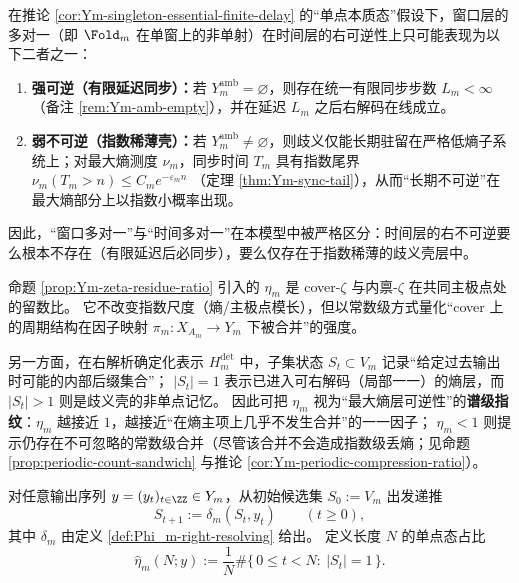 \begin{corollary}\label{cor:Ym-time-layer-dichotomy}
在推论 \ref{cor:Ym-singleton-essential-finite-delay} 的“单点本质态”假设下，窗口层的多对一（即 \(\Fold_m\) 在单窗上的非单射）在时间层的右可逆性上只可能表现为以下二者之一：
\begin{enumerate}
  \item \textbf{强可逆（有限延迟同步）：}若 \(Y_m^{\mathrm{amb}}=\varnothing\)，则存在统一有限同步步数 \(L_m<\infty\)（备注 \ref{rem:Ym-amb-empty}），并在延迟 \(L_m\) 之后右解码在线成立。
  \item \textbf{弱不可逆（指数稀薄壳）：}若 \(Y_m^{\mathrm{amb}}\neq\varnothing\)，则歧义仅能长期驻留在严格低熵子系统上；对最大熵测度 \(\nu_m\)，同步时间 \(T_m\) 具有指数尾界
  \(
  \nu_m(T_m>n)\le C_m e^{-\varepsilon_m n}
  \)
（定理 \ref{thm:Ym-sync-tail}），从而“长期不可逆”在最大熵部分上以指数小概率出现。
\end{enumerate}
因此，“窗口多对一”与“时间多对一”在本模型中被严格区分：时间层的右不可逆要么根本不存在（有限延迟后必同步），要么仅存在于指数稀薄的歧义壳层中。
\end{corollary}

\begin{remark}\label{rem:eta_m_as_reversibility_certificate}
命题 \ref{prop:Ym-zeta-residue-ratio} 引入的 \(\eta_m\) 是 cover-\(\zeta\) 与内禀-\(\zeta\) 在共同主极点处的留数比。
它不改变指数尺度（熵/主极点模长），但以常数级方式量化“cover 上的周期结构在因子映射 \(\pi_m:X_{A_m}\to Y_m\) 下被合并”的强度。
\par
另一方面，在右解析确定化表示 \(H_m^{\mathrm{det}}\) 中，子集状态 \(S_t\subset V_m\) 记录“给定过去输出时可能的内部后缀集合”；
\(|S_t|=1\) 表示已进入可右解码（局部一一）的熵层，而 \(|S_t|>1\) 则是歧义壳的非单点记忆。
因此可把 \(\eta_m\) 视为“最大熵层可逆性”的\textbf{谱级指纹}：\(\eta_m\) 越接近 \(1\)，越接近“在熵主项上几乎不发生合并”的一一因子；
\(\eta_m<1\) 则提示仍存在不可忽略的常数级合并（尽管该合并不会造成指数级丢熵；见命题 \ref{prop:periodic-count-sandwich} 与推论 \ref{cor:Ym-periodic-compression-ratio}）。
\end{remark}

\begin{definition}\label{def:eta_m_hat_singleton_rate}
对任意输出序列 \(y=(y_t)_{t\in\ZZ}\in Y_m\)，从初始候选集 \(S_0:=V_m\) 出发递推
\[
S_{t+1}:=\delta_m(S_t,y_t)\qquad (t\ge 0),
\]
其中 \(\delta_m\) 由定义 \ref{def:Phi_m-right-resolving} 给出。
定义长度 \(N\) 的单点态占比
\[
\widehat\eta_m(N;y):=\frac{1}{N}\#\{\,0\le t<N:\ |S_t|=1\,\}.
\]
\end{definition}


